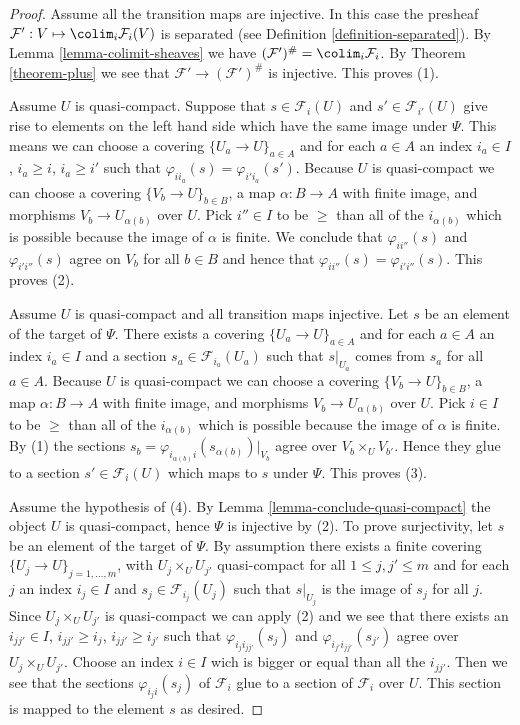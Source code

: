 \begin{proof}
Assume all the transition maps are injective. In this case the presheaf
$\mathcal{F}' : V \mapsto \colim_i \mathcal{F}_i(V)$ is
separated (see Definition \ref{definition-separated}).
By Lemma \ref{lemma-colimit-sheaves}
we have
$(\mathcal{F}')^\# = \colim_i \mathcal{F}_i$.
By Theorem \ref{theorem-plus}
we see that $\mathcal{F}' \to (\mathcal{F}')^\#$ is injective.
This proves (1).

\medskip\noindent
Assume $U$ is quasi-compact. Suppose that $s \in \mathcal{F}_i(U)$ and
$s' \in \mathcal{F}_{i'}(U)$ give rise to elements on
the left hand side which have the same image under $\Psi$.
This means we can choose a covering $\{U_a \to U\}_{a \in A}$
and for each $a \in A$ an index $i_a \in I$, $i_a \geq i$, $i_a \geq i'$
such that $\varphi_{ii_a}(s) = \varphi_{i'i_a}(s')$.
Because $U$ is quasi-compact we can choose a covering
$\{V_b \to U\}_{b \in B}$, a map $\alpha : B \to A$ with finite image,
and morphisms $V_b \to U_{\alpha(b)}$ over $U$.
Pick $i''\in I$ to be $\geq$ than all of the $i_{\alpha(b)}$
which is possible because the image of $\alpha$ is finite.
We conclude that $\varphi_{ii''}(s)$ and $\varphi_{i'i''}(s)$
agree on $V_b$ for all $b \in B$ and hence that
$\varphi_{ii''}(s) = \varphi_{i'i''}(s)$. This proves (2).

\medskip\noindent
Assume $U$ is quasi-compact and all transition maps injective.
Let $s$ be an element of the target of $\Psi$. There exists a covering
$\{U_a \to U\}_{a \in A}$ and for each $a \in A$ an index $i_a \in I$
and a section $s_a \in \mathcal{F}_{i_a}(U_a)$
such that $s|_{U_a}$ comes from $s_a$ for all $a \in A$.
Because $U$ is quasi-compact we can choose a covering
$\{V_b \to U\}_{b \in B}$, a map $\alpha : B \to A$ with finite image,
and morphisms $V_b \to U_{\alpha(b)}$ over $U$.
Pick $i \in I$ to be $\geq$ than all of the $i_{\alpha(b)}$
which is possible because the image of $\alpha$ is finite.
By (1) the sections
$s_b = \varphi_{i_{\alpha(b)} i}(s_{\alpha(b)})|_{V_b}$
agree over $V_b \times_U V_{b'}$.
Hence they glue to a section
$s' \in \mathcal{F}_i(U)$ which maps to $s$ under $\Psi$.
This proves (3).

\medskip\noindent
Assume the hypothesis of (4). By Lemma \ref{lemma-conclude-quasi-compact}
the object $U$ is quasi-compact, hence $\Psi$ is injective by (2).
To prove surjectivity, let $s$ be an element of the target of $\Psi$.
By assumption there  exists a finite covering
$\{U_j \to U\}_{j = 1, \ldots, m}$, with $U_j \times_U U_{j'}$
quasi-compact for all $1 \leq j, j' \leq m$ and
for each $j$ an index $i_j \in I$ and $s_j \in \mathcal{F}_{i_j}(U_j)$
such that $s|_{U_j}$ is the image of $s_j$ for all $j$.
Since $U_j \times_U U_{j'}$ is quasi-compact we can apply (2)
and we see that there exists an $i_{jj'} \in I$,
$i_{jj'} \geq i_j$, $i_{jj'} \geq i_{j'}$ such that
$\varphi_{i_ji_{jj'}}(s_j)$ and $\varphi_{i_{j'}i_{jj'}}(s_{j'})$
agree over $U_j \times_U U_{j'}$. Choose an index $i \in I$
wich is bigger or equal than all the $i_{jj'}$. Then we see that
the sections $\varphi_{i_ji}(s_j)$ of $\mathcal{F}_i$ glue
to a section of $\mathcal{F}_i$ over $U$. This section is mapped
to the element $s$ as desired.
\end{proof}

